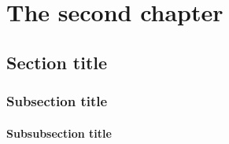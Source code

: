 \chapter{The second chapter} %
\label{ch:lit} %

\section{Section title}
\subsection{Subsection title}
\subsubsection{Subsubsection title}
\blindtext

